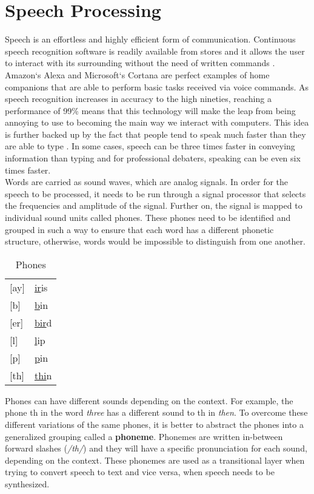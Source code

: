 \chapter{Speech Processing}\label{ch:speech_processing}

Speech is an effortless and highly efficient form of communication.
Continuous speech recognition software is readily available from stores and it allows the user to interact with its surrounding without the need of written commands
\cite[p.~396]{callan2003artificial}. Amazon`s Alexa 
\cite{Alexa} and Microsoft`s Cortana 
\cite{Cortana} are perfect examples of home companions that are able to perform basic tasks received via voice commands.
As speech recognition increases in accuracy to the high nineties, reaching a performance of 99\% means that this technology will make the leap from being annoying to use to becoming the main way we interact with computers. 
This idea is further backed up by the fact that people tend to speak much faster than they are able to type \cite{Speed}.
In some cases, speech can be three times faster in conveying information than typing and for professional debaters,
speaking can be even six times faster. \\

Words are carried as sound waves, which are analog signals.
In order for the speech to be processed,
it needs to be run through a signal processor that selects the frequencies and amplitude of the signal.
Further on, the signal is mapped to individual sound units called phones.
These phones need to be identified and grouped in such a way to ensure that each word has a different phonetic structure,
otherwise, words would be impossible to distinguish from one another. \\

\begin{table}[]
\centering
\caption{Phones}
\label{my-label}
\begin{tabular}{ll}
{[}ay{]} & \underline{ir}is \\
{[}b{]}  & \underline{b}in  \\
{[}er{]} & \underline{bir}d \\
{[}l{]}  & \underline{l}ip  \\
{[}p{]}  & \underline{p}in  \\
{[}th{]} & \underline{thi}n
\end{tabular}
\end{table}

Phones can have different sounds depending on the context. 
For example, the phone th in the word \textit{three} has a different sound to th in \textit{then}. 
To overcome these different variations of the same phones, 
it is better to abstract the phones into a generalized grouping called a \textbf{phoneme}.
Phonemes are written in-between forward slashes
(\textit{/th/}) and they will have a specific pronunciation for each sound, depending on the context.
These phonemes are used as a transitional layer when trying to convert speech to text and vice versa,
when speech needs to be synthesized.\\

